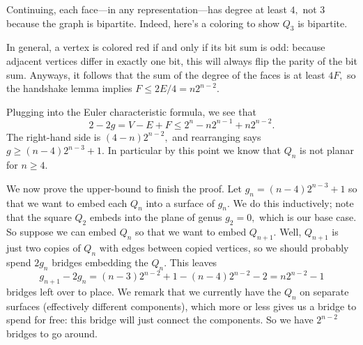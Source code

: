 Continuing, each face---in any representation---has degree at least $4,$ not $3$ because the graph is bipartite. Indeed, here's a coloring to show $Q_3$ is bipartite.
\begin{center}
\end{center}
In general, a vertex is colored red if and only if its bit sum is odd: because adjacent vertices differ in exactly one bit, this will always flip the parity of the bit sum. Anyways, it follows that the sum of the degree of the faces is at least $4F,$ so the handshake lemma implies $F\le2E/4=n2^{n-2}.$

Plugging into the Euler characteristic formula, we see that
\[2-2g=V-E+F\le2^n-n2^{n-1}+n2^{n-2}.\]
The right-hand side is $(4-n)2^{n-2},$ and rearranging says $g\ge(n-4)2^{n-3}+1.$ In particular by this point we know that $Q_n$ is not planar for $n\ge4.$

We now prove the upper-bound to finish the proof. Let $g_n=(n-4)2^{n-3}+1$ so that we want to embed each $Q_n$ into a surface of $g_n.$ We do this inductively; note that the square $Q_2$ embeds into the plane of genus $g_2=0,$ which is our base case. So suppose we can embed $Q_n$ so that we want to embed $Q_{n+1}.$ Well, $Q_{n+1}$ is just two copies of $Q_n$ with edges between copied vertices, so we should probably spend $2g_n$ bridges embedding the $Q_n.$ This leaves
\[g_{n+1}-2g_n=(n-3)2^{n-2}+1-(n-4)2^{n-2}-2=n2^{n-2}-1\]
bridges left over to place. We remark that we currently have the $Q_n$ on separate surfaces (effectively different components), which more or less gives us a bridge to spend for free: this bridge will just connect the components. So we have $2^{n-2}$ bridges to go around.


